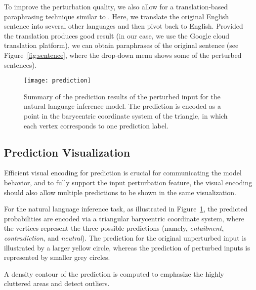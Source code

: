 To improve the perturbation quality, we also allow for a translation-based paraphrasing technique similar to \citet{mallinson2017paraphrasing}. Here, we translate the original English sentence into several other languages and then pivot back to English. Provided the translation produces good result (in our case, we use the Google cloud translation platform), we can obtain paraphrases of the original sentence (see Figure~\ref{fig:sentence}, where the drop-down menu shows some of the perturbed sentences).

\begin{figure}[htbp]
\centering
\vspace{-2mm}
 \texttt{[image: prediction]}
 \caption{
Summary of the prediction results of the perturbed input for the natural language inference model.
The prediction is encoded as a point in the barycentric coordinate system of the triangle, in which each vertex corresponds to one prediction label.
}
\vspace{-3mm}
\label{fig:prediction}
\end{figure}

\subsection{Prediction Visualization}
Efficient visual encoding for prediction is crucial for communicating the model behavior, and to fully support the input perturbation feature, the visual encoding should also allow multiple predictions to be shown in the same visualization.
%

For the natural language inference task, as illustrated in Figure~\ref{fig:prediction}, the predicted probabilities are encoded via a triangular barycentric coordinate system, where the vertices represent the three possible predictions (namely, \emph{entailment}, \emph{contradiction}, and \emph{neutral}). The prediction for the original unperturbed input is illustrated by a larger yellow circle, whereas the prediction of perturbed inputs is represented by smaller grey circles.

A density contour of the prediction is computed to emphasize the highly cluttered areas and detect outliers.

